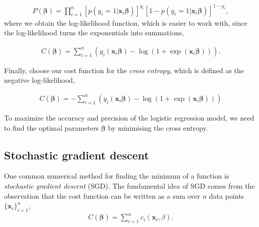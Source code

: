 
\begin{align*}
P(\boldsymbol{\beta}) = \prod_{i=1}^{n} \left[ p(y_i=1|\boldsymbol{x}_i \boldsymbol{\beta}) \right]^{y_i} \left[1- p(y_i=1|\boldsymbol{x}_i \boldsymbol{\beta}) \right]^{1-y_i},
\end{align*}
\noindent where we obtain the log-likelihood function, which is easier to work with, since the log-likelihood turns the exponentials into summations,%

\begin{align*}
C(\boldsymbol{\beta}) = \sum_{i=1}^n \left(y_i(\boldsymbol{x}_i \boldsymbol{\beta}) - \log{(1 + \exp{(\boldsymbol{x}_i \boldsymbol{\beta})})}  \right).
\end{align*}

\noindent Finally, choose our cost function for the \textit{cross entropy}, which is defined as the negative log-likelihood,


%
\begin{align*}
C(\boldsymbol{\beta}) = - \sum_{i=1}^n \left(y_i(\boldsymbol{x}_i \boldsymbol{\beta}) - \log{(1 + \exp{(\boldsymbol{x}_i \boldsymbol{\beta})})}  \right)
\end{align*}

\noindent To maximize the accuracy and precision of the logistic regression model, we need to find the optimal parameters $\boldsymbol{\beta}$ by minimising the cross entropy.

\subsection{Stochastic gradient descent}

One common numerical method for finding the minimum of a function is \textit{stochastic gradient descent} (SGD). The fundamental idea of SGD comes from the observation that the cost function can be written as a sum over $n$ data points $\{\boldsymbol{x}_i\}_{i=1}^{n}$,
\begin{align*}
C(\boldsymbol{\beta}) = \sum_{i=1}^{n} c_i(\boldsymbol{x}_i,\beta).
\end{align*}


